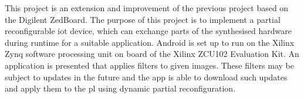 This project is an extension and improvement of the previous project \cite{oldrepo} based on the Digilent ZedBoard. The purpose of this project is to implement a partial reconfigurable \gls{iot} device, which can exchange parts of the synthesised hardware during runtime for
a suitable application. Android is set up to run on the Xilinx Zynq software processing unit on board of the Xilinx ZCU102 Evaluation Kit.
An application is presented that applies filters to given images. 
These filters may be subject to updates in the future and the app is able to download such updates and apply them to the \gls{pl} using dynamic partial reconfiguration.
